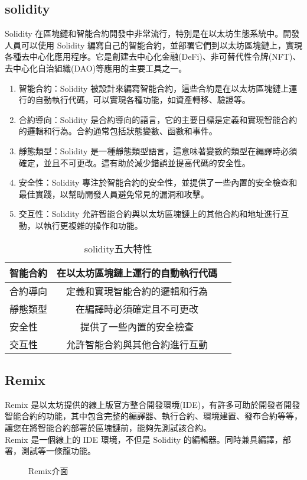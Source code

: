 \documentclass[12pt, a4paper]{article}
\begin{document}
\subsection{solidity}
Solidity 在區塊鏈和智能合約開發中非常流行，特別是在以太坊生態系統中。開發人員可以使用 Solidity 編寫自己的智能合約，並部署它們到以太坊區塊鏈上，實現各種去中心化應用程序。它是創建去中心化金融(DeFi)、非可替代性令牌(NFT)、去中心化自治組織(DAO)等應用的主要工具之一。
\begin{enumerate}
\item 智能合約：Solidity 被設計來編寫智能合約，這些合約是在以太坊區塊鏈上運行的自動執行代碼，可以實現各種功能，如資產轉移、驗證等。
\item 合約導向：Solidity 是合約導向的語言，它的主要目標是定義和實現智能合約的邏輯和行為。合約通常包括狀態變數、函數和事件。
\item 靜態類型：Solidity 是一種靜態類型語言，這意味著變數的類型在編譯時必須確定，並且不可更改。這有助於減少錯誤並提高代碼的安全性。
\item 安全性：Solidity 專注於智能合約的安全性，並提供了一些內置的安全檢查和最佳實踐，以幫助開發人員避免常見的漏洞和攻擊。
\item 交互性：Solidity 允許智能合約與以太坊區塊鏈上的其他合約和地址進行互動，以執行更複雜的操作和功能。
\end{enumerate}

\begin{table}[H]
\centering
\caption{solidity五大特性}\label{tb:solidity五大特性}  
\extrarowheight=6pt  
\colorbox{bubbles}{\begin{tabular}{lcc}
\hline
  智能合約	& 在以太坊區塊鏈上運行的自動執行代碼\\\hline  
  合約導向	& 定義和實現智能合約的邏輯和行為	\\\hline
  靜態類型 	& 在編譯時必須確定且不可更改		\\\hline
  安全性 	    & 提供了一些內置的安全檢查		    \\\hline
  交互性   	& 允許智能合約與其他合約進行互動		\\\hline
\end{tabular}}
\end{table}
\subsection{Remix}
Remix 是以太坊提供的線上版官方整合開發環境(IDE)，有許多可助於開發者開發智能合約的功能，其中包含完整的編譯器、執行合約、環境建置、發布合約等等，讓您在將智能合約部署於區塊鏈前，能夠先測試該合約。\\
Remix 是一個線上的 IDE 環境，不但是 Solidity 的編輯器。同時兼具編譯，部署，測試等一條龍功能。
\begin{figure}[H]
    \caption{Remix介面}
    \label{fig:Remix}
\end{figure}
\end{document}
